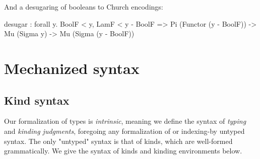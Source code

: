\documentclass[authoryear, acmsmall, screen, review, nonacm]{acmart}
\begin{document}
\Ni And a desugaring of booleans to Church encodings:

\begin{rosi}
desugar : forall y. BoolF < y, LamF < y - BoolF =>
          Pi (Functor (y - BoolF)) -> Mu (Sigma y) -> Mu (Sigma (y - BoolF))
\end{rosi}

\section{Mechanized syntax}

\subsection{Kind syntax}

Our formalization of \Rome types is \emph{intrinsic}, meaning we define the syntax of \emph{typing} and \emph{kinding judgments}, foregoing any formalization of or indexing-by untyped syntax. The only "untyped" syntax is that of kinds, which are well-formed grammatically. We give the syntax of kinds and kinding environments below.

\begin{code}%
\>[0]\AgdaSpace{}%
\AgdaSpace{}%
\AgdaSymbol{:}\AgdaSpace{}%
\AgdaSpace{}%
\<%
\\
\>[0][@{}l@{\AgdaIndent{0}}]%
\>[2]%
\>[8]\AgdaSymbol{:}\AgdaSpace{}%
\<%
\\
%
\>[2]%
\>[8]\AgdaSymbol{:}\AgdaSpace{}%
\<%
\\
%
\>[2]\AgdaSpace{}%
\AgdaSymbol{:}\AgdaSpace{}%
\AgdaSpace{}%
\AgdaSpace{}%
\AgdaSpace{}%
\AgdaSpace{}%
\<%
\\
%
\>[2]%
\>[8]\AgdaSymbol{:}\AgdaSpace{}%
\AgdaSpace{}%
\AgdaSpace{}%
\<%
\\
%
\\[\AgdaEmptyExtraSkip]%
\>[0]\AgdaSpace{}%
\AgdaSpace{}%
\<%
\end{code}
\end{document}
